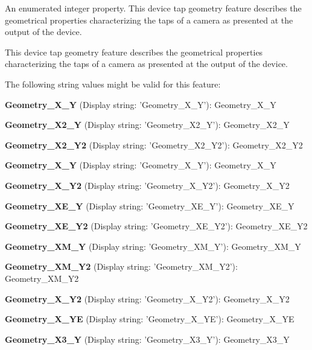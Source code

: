 An enumerated integer property. This device tap geometry feature describes the geometrical properties characterizing the taps of a camera as presented at the output of the device. 

This device tap geometry feature describes the geometrical properties characterizing the taps of a camera as presented at the output of the device.

The following string values might be valid for this feature\+:
\begin{DoxyItemize}
\item {\bfseries Geometry\+\_\+X\+\_\+Y} (Display string\+: 'Geometry\+\_\+X\+\_\+Y')\+: Geometry\+\_\+X\+\_\+Y
\item {\bfseries Geometry\+\_\+X2\+\_\+Y} (Display string\+: 'Geometry\+\_\+X2\+\_\+Y')\+: Geometry\+\_\+X2\+\_\+Y
\item {\bfseries Geometry\+\_\+X2\+\_\+Y2} (Display string\+: 'Geometry\+\_\+X2\+\_\+Y2')\+: Geometry\+\_\+X2\+\_\+Y2
\item {\bfseries Geometry\+\_\+X\+\_\+Y} (Display string\+: 'Geometry\+\_\+X\+\_\+Y')\+: Geometry\+\_\+X\+\_\+Y
\item {\bfseries Geometry\+\_\+X\+\_\+Y2} (Display string\+: 'Geometry\+\_\+X\+\_\+Y2')\+: Geometry\+\_\+X\+\_\+Y2
\item {\bfseries Geometry\+\_\+X\+E\+\_\+Y} (Display string\+: 'Geometry\+\_\+X\+E\+\_\+Y')\+: Geometry\+\_\+X\+E\+\_\+Y
\item {\bfseries Geometry\+\_\+X\+E\+\_\+Y2} (Display string\+: 'Geometry\+\_\+X\+E\+\_\+Y2')\+: Geometry\+\_\+X\+E\+\_\+Y2
\item {\bfseries Geometry\+\_\+X\+M\+\_\+Y} (Display string\+: 'Geometry\+\_\+X\+M\+\_\+Y')\+: Geometry\+\_\+X\+M\+\_\+Y
\item {\bfseries Geometry\+\_\+X\+M\+\_\+Y2} (Display string\+: 'Geometry\+\_\+X\+M\+\_\+Y2')\+: Geometry\+\_\+X\+M\+\_\+Y2
\item {\bfseries Geometry\+\_\+X\+\_\+Y2} (Display string\+: 'Geometry\+\_\+X\+\_\+Y2')\+: Geometry\+\_\+X\+\_\+Y2
\item {\bfseries Geometry\+\_\+X\+\_\+Y\+E} (Display string\+: 'Geometry\+\_\+X\+\_\+Y\+E')\+: Geometry\+\_\+X\+\_\+Y\+E
\item {\bfseries Geometry\+\_\+X3\+\_\+Y} (Display string\+: 'Geometry\+\_\+X3\+\_\+Y')\+: Geometry\+\_\+X3\+\_\+Y

\end{DoxyItemize}
